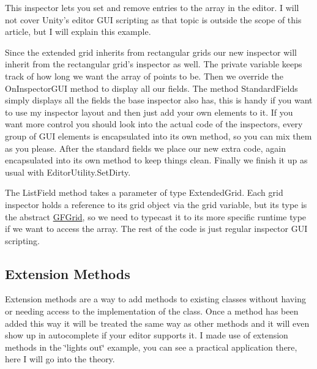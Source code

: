  This inspector lets you set and remove entries to the array in the editor. I will not cover Unity's editor G\+U\+I scripting as that topic is outside the scope of this article, but I will explain this example.

Since the extended grid inherits from rectangular grids our new inspector will inherit from the rectangular grid's inspector as well. The private variable keeps track of how long we want the array of points to be. Then we override the {\ttfamily On\+Inspector\+G\+U\+I} method to display all our fields. The method {\ttfamily Standard\+Fields} simply displays all the fields the base inspector also has, this is handy if you want to use my inspector layout and then just add your own elements to it. If you want more control you should look into the actual code of the inspectors, every group of G\+U\+I elements is encapsulated into its own method, so you can mix them as you please. After the standard fields we place our new extra code, again encapsulated into its own method to keep things clean. Finally we finish it up as usual with {\ttfamily Editor\+Utility.\+Set\+Dirty}.

The {\ttfamily List\+Field} method takes a parameter of type Extended\+Grid. Each grid inspector holds a reference to its grid object via the {\ttfamily grid} variable, but its type is the abstract {\ttfamily \hyperlink{class_g_f_grid}{G\+F\+Grid}}, so we need to typecast it to its more specific runtime type if we want to access the array. The rest of the code is just regular inspector G\+U\+I scripting.

\subsection*{Extension Methods }

Extension methods are a way to add methods to existing classes without having or needing access to the implementation of the class. Once a method has been added this way it will be treated the same way as other methods and it will even show up in autocomplete if your editor supports it. I made use of extension methods in the \char`\"{}lights out\char`\"{} example, you can see a practical application there, here I will go into the theory.

